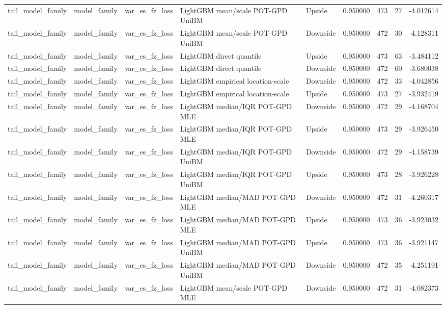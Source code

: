 \begin{tabular}{lllllrrr}
tail\_model\_family & model\_family & var\_es\_fz\_loss & LightGBM mean/scale POT-GPD UniBM & Upside & 0.950000 & 473 & 27 & -4.012614 \\
tail\_model\_family & model\_family & var\_es\_fz\_loss & LightGBM mean/scale POT-GPD UniBM & Downside & 0.950000 & 472 & 30 & -4.128311 \\
tail\_model\_family & model\_family & var\_es\_fz\_loss & LightGBM direct quantile & Upside & 0.950000 & 473 & 63 & -3.484112 \\
tail\_model\_family & model\_family & var\_es\_fz\_loss & LightGBM direct quantile & Downside & 0.950000 & 472 & 60 & -3.680038 \\
tail\_model\_family & model\_family & var\_es\_fz\_loss & LightGBM empirical location-scale & Downside & 0.950000 & 472 & 33 & -4.042856 \\
tail\_model\_family & model\_family & var\_es\_fz\_loss & LightGBM empirical location-scale & Upside & 0.950000 & 473 & 27 & -3.932419 \\
tail\_model\_family & model\_family & var\_es\_fz\_loss & LightGBM median/IQR POT-GPD MLE & Downside & 0.950000 & 472 & 29 & -4.168704 \\
tail\_model\_family & model\_family & var\_es\_fz\_loss & LightGBM median/IQR POT-GPD MLE & Upside & 0.950000 & 473 & 29 & -3.926450 \\
tail\_model\_family & model\_family & var\_es\_fz\_loss & LightGBM median/IQR POT-GPD UniBM & Downside & 0.950000 & 472 & 29 & -4.158739 \\
tail\_model\_family & model\_family & var\_es\_fz\_loss & LightGBM median/IQR POT-GPD UniBM & Upside & 0.950000 & 473 & 28 & -3.926228 \\
tail\_model\_family & model\_family & var\_es\_fz\_loss & LightGBM median/MAD POT-GPD MLE & Downside & 0.950000 & 472 & 31 & -4.260317 \\
tail\_model\_family & model\_family & var\_es\_fz\_loss & LightGBM median/MAD POT-GPD MLE & Upside & 0.950000 & 473 & 36 & -3.923032 \\
tail\_model\_family & model\_family & var\_es\_fz\_loss & LightGBM median/MAD POT-GPD UniBM & Upside & 0.950000 & 473 & 36 & -3.921147 \\
tail\_model\_family & model\_family & var\_es\_fz\_loss & LightGBM median/MAD POT-GPD UniBM & Downside & 0.950000 & 472 & 35 & -4.251191 \\
tail\_model\_family & model\_family & var\_es\_fz\_loss & LightGBM mean/scale POT-GPD MLE & Downside & 0.950000 & 472 & 31 & -4.082373 \\

\end{tabular}
